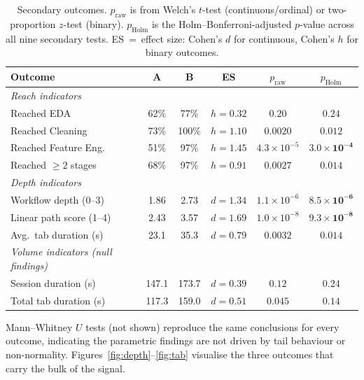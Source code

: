 \documentclass[11pt,a4paper]{article}
\begin{document}
\begin{table}[ht]
\centering\small
\renewcommand{\arraystretch}{1.18}
\caption{Secondary outcomes. $p_{\text{raw}}$ is from Welch's
$t$-test (continuous/ordinal) or two-proportion $z$-test
(binary). $p_{\text{Holm}}$ is the Holm--Bonferroni-adjusted
$p$-value across all nine secondary tests. ES~=~effect size:
Cohen's $d$ for continuous, Cohen's $h$ for binary outcomes.}
\label{tab:secondary}
\begin{tabular}{@{}lccccc@{}}
\toprule
\textbf{Outcome} & \textbf{A} & \textbf{B} & \textbf{ES}
   & \textbf{$p_{\text{raw}}$} & \textbf{$p_{\text{Holm}}$} \\
\midrule
\textit{Reach indicators} & & & & & \\
\quad Reached EDA              & 62\%  & 77\%  & $h=0.32$ & $0.20$ & $0.24$ \\
\quad Reached Cleaning         & 73\%  & 100\% & $h=1.10$ & $0.0020$ & $\mathbf{0.012}$ \\
\quad Reached Feature Eng.     & 51\%  & 97\%  & $h=1.45$ & $4.3\times10^{-5}$ & $\mathbf{3.0\times10^{-4}}$ \\
\quad Reached $\geq 2$ stages  & 68\%  & 97\%  & $h=0.91$ & $0.0027$ & $\mathbf{0.014}$ \\
\midrule
\textit{Depth indicators} & & & & & \\
\quad Workflow depth (0--3)    & 1.86  & 2.73  & $d=1.34$ & $1.1\times10^{-6}$ & $\mathbf{8.5\times10^{-6}}$ \\
\quad Linear path score (1--4) & 2.43  & 3.57  & $d=1.69$ & $1.0\times10^{-8}$ & $\mathbf{9.3\times10^{-8}}$ \\
\quad Avg.\ tab duration (s)   & 23.1  & 35.3  & $d=0.79$ & $0.0032$ & $\mathbf{0.014}$ \\
\midrule
\textit{Volume indicators (null findings)} & & & & & \\
\quad Session duration (s)     & 147.1 & 173.7 & $d=0.39$ & $0.12$ & $0.24$ \\
\quad Total tab duration (s)   & 117.3 & 159.0 & $d=0.51$ & $0.045$ & $0.14$ \\
\bottomrule
\end{tabular}
\end{table}

\noindent
Mann--Whitney $U$ tests (not shown) reproduce the same
conclusions for every outcome, indicating the parametric
findings are not driven by tail behaviour or non-normality.
Figures~\ref{fig:depth}--\ref{fig:tab} visualise the three
outcomes that carry the bulk of the signal.
\end{document}
